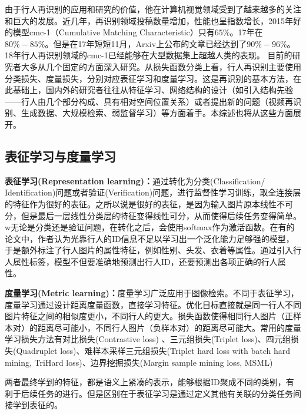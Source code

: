 由于行人再识别的应用和研究的价值，他在计算机视觉领域受到了越来越多的关注和巨大的发展。近几年，再识别领域投稿数量增加，性能也呈指数增长，2015年好的模型cmc-1（Cumulative Matching Characteristic）只有$65\%$。17年在$80\%-85\%$。但是在17年短短11月，Arxiv上公布的文章已经达到了$90\%-96\%$。18年行人再识别领域的cmc-1已经能够在大型数据集上超越人类的表现。
目前的研究者大多从几个固定的方面深入研究。从损失函数分类上看，行人再识别主要使用分类损失、度量损失，分别对应表征学习和度量学习。这是再识别的基本方法，在此基础上，国内外的研究者往往从特征学习、网络结构的设计（如引入结构先验——行人由几个部分构成、具有相对空间位置关系）或者提出新的问题（视频再识别、生成数据、大规模检索、弱监督学习）等方面着手。本综述也将从这些方面展开。

    \subsection{表征学习与度量学习}

    \textbf{表征学习(Representation learning)：}通过转化为分类(Classification/ Identification)问题或者验证(Verification)问题，进行监督性学习训练，取全连接层的特征作为很好的表征。之所以说是很好的表征，是因为输入图片原本线性不可分，但是最后一层线性分类层的特征变得线性可分，从而使得后续任务变得简单。w无论是分类还是验证问题，在转化之后，会使用softmax作为激活函数。在有的论文中，作者认为光靠行人的ID信息不足以学习出一个泛化能力足够强的模型，于是额外标注了行人图片的属性特征，例如性别、头发、衣着等属性。通过引入行人属性标签，模型不但要准确地预测出行人ID，还要预测出各项正确的行人属性。

    \textbf{度量学习(Metric learning)：}度量学习广泛应用于图像检索。不同于表征学习，度量学习通过设计距离度量函数，直接学习特征。优化目标直接就是同一行人不同图片特征之间的相似度更小，不同行人的更大。损失函数使得相同行人图片（正样本对）的距离尽可能小，不同行人图片（负样本对）的距离尽可能大。常用的度量学习损失方法有对比损失(Contrastive loss) \cite{varior2016gated}、三元组损失(Triplet loss)、四元组损失(Quadruplet loss)、难样本采样三元组损失(Triplet hard loss with batch hard mining, TriHard loss)\cite{hermans2017defense}、边界挖掘损失(Margin sample mining loss, MSML)

    两者最终学到的特征，都是语义上紧凑的表示，能够根据ID聚成不同的类别，有利于后续任务的进行。但是区别在于表征学习是通过定义其他有关联的分类任务间接学到表征的。

